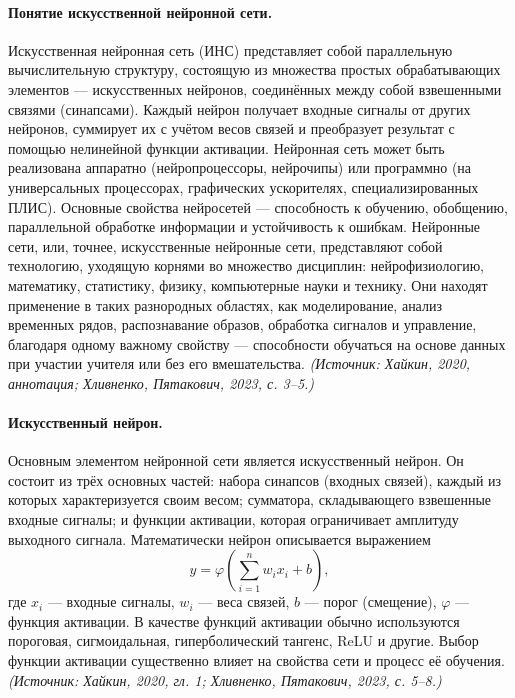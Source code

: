 \documentclass[a4paper,12pt]{article}
\begin{document}
\paragraph{Понятие искусственной нейронной сети.}
Искусственная нейронная сеть (ИНС) представляет собой параллельную вычислительную структуру, состоящую из множества простых обрабатывающих элементов — искусственных нейронов, соединённых между собой взвешенными связями (синапсами). Каждый нейрон получает входные сигналы от других нейронов, суммирует их с учётом весов связей и преобразует результат с помощью нелинейной функции активации. Нейронная сеть может быть реализована аппаратно (нейропроцессоры, нейрочипы) или программно (на универсальных процессорах, графических ускорителях, специализированных ПЛИС). Основные свойства нейросетей — способность к обучению, обобщению, параллельной обработке информации и устойчивость к ошибкам. Нейронные сети, или, точнее, искусственные нейронные сети, представляют собой технологию, уходящую корнями во множество дисциплин: нейрофизиологию, математику, статистику, физику, компьютерные науки и технику. Они находят применение в таких разнородных областях, как моделирование, анализ временных рядов, распознавание образов, обработка сигналов и управление, благодаря одному важному свойству — способности обучаться на основе данных при участии учителя или без его вмешательства.
\textit{(Источник: Хайкин, 2020, аннотация; Хливненко, Пятакович, 2023, с. 3--5.)}

\paragraph{Искусственный нейрон.}
Основным элементом нейронной сети является искусственный нейрон. Он состоит из трёх основных частей: набора синапсов (входных связей), каждый из которых характеризуется своим весом; сумматора, складывающего взвешенные входные сигналы; и функции активации, которая ограничивает амплитуду выходного сигнала. Математически нейрон описывается выражением
\[
y = \varphi\left(\sum_{i=1}^{n} w_i x_i + b\right),
\]
где \(x_i\) — входные сигналы, \(w_i\) — веса связей, \(b\) — порог (смещение), \(\varphi\) — функция активации. В качестве функций активации обычно используются пороговая, сигмоидальная, гиперболический тангенс, ReLU и другие. Выбор функции активации существенно влияет на свойства сети и процесс её обучения.
\textit{(Источник: Хайкин, 2020, гл. 1; Хливненко, Пятакович, 2023, с. 5--8.)}
\end{document}
